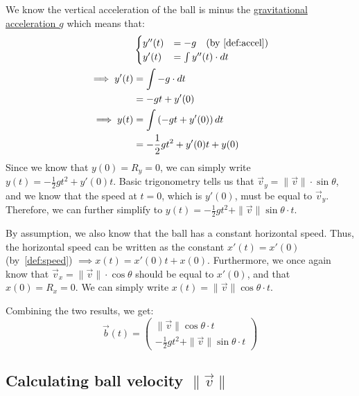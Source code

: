 \documentclass[11pt]{report}
\begin{document}
We know the vertical acceleration of the ball is minus the
\href{https://en.wikipedia.org/wiki/Gravitational_acceleration}{gravitational
	acceleration $g$} which means that:
\[
	\begin{aligned}
		               & \begin{cases}
			                 y''(t) & = -g \quad \text{(by~\ref{def:accel})} \\
			                 y'(t)  & = \int y''(t) \cdot dt                 \\
		                 \end{cases} \\
		\implies y'(t) & = \int -g \cdot dt                                     \\
		               & = -gt + y'(0)                                          \\
		\implies y(t)  & = \int \left(-gt + y'(0)\right) dt                     \\
		               & = -\frac12 gt^2 + y'(0) t + y(0)                       \\
	\end{aligned}
\]
Since we know that $y(0) = R_y = 0$, we can simply write $y(t) = -\frac{1}{2}gt^2 + y'(0) t$. Basic trigonometry tells us that $\vec{v}_y = \|\vec{v}\|\cdot \sin\theta$, and we know that the speed at $t=0$, which is $y'(0)$, must be equal to $\vec{v}_y$. Therefore, we can further simplify to $y(t) = -\frac{1}{2}gt^2 + \|\vec{v}\|\sin\theta \cdot t$.

By assumption, we also know that the ball has a constant horizontal speed. Thus, the horizontal speed can be written as the constant $x'(t) = x'(0)$ (by~\ref{def:speed}) $\implies x(t) = x'(0)t + x(0)$. Furthermore, we once again know that $\vec{v}_x = \|\vec{v}\|\cdot \cos \theta$ should be equal to $x'(0)$, and that $x(0) = R_x = 0$. We can simply write $x(t) = \|\vec{v}\| \cos \theta \cdot t$.

Combining the two results, we get:
\[
	\vec{b}(t) = \begin{pmatrix}
		\|\vec{v}\|\cos \theta \cdot t \\
		-\frac{1}{2}gt^2 + \|\vec{v}\| \sin\theta \cdot t
	\end{pmatrix}
\]

\subsection{Calculating ball velocity \texorpdfstring{$\|\vec{v}\|$}{||v||}}
\end{document}
